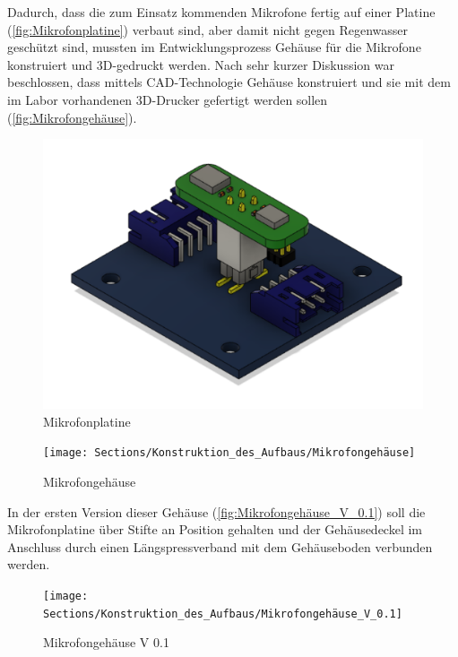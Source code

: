 Dadurch, dass die zum Einsatz kommenden Mikrofone fertig auf einer Platine (\autoref{fig:Mikrofonplatine}) verbaut sind, aber damit nicht gegen Regenwasser geschützt sind, mussten im Entwicklungsprozess Gehäuse für die Mikrofone konstruiert und 3D-gedruckt werden. Nach sehr kurzer Diskussion war beschlossen, dass mittels CAD-Technologie Gehäuse konstruiert und sie mit dem im Labor vorhandenen 3D-Drucker gefertigt werden sollen (\autoref{fig:Mikrofongehäuse}).

\begin{figure}[h]
	\begin{center}
		\includegraphics[scale=0.25]{Sections/Konstruktion_des_Aufbaus/Mikrofonplatine}
	\end{center}
	\caption{Mikrofonplatine}
	\label{fig:Mikrofonplatine}
\end{figure}

\newpage

\begin{figure}[h]
	\begin{center}
		\texttt{[image: Sections/Konstruktion\_des\_Aufbaus/Mikrofongehäuse]}
	\end{center}
	\caption{Mikrofongehäuse}
	\label{fig:Mikrofongehäuse}
\end{figure}

In der ersten Version dieser Gehäuse (\autoref{fig:Mikrofongehäuse_V_0.1}) soll die Mikrofonplatine über Stifte an Position gehalten und der Gehäusedeckel im Anschluss durch einen Längspressverband mit dem Gehäuseboden verbunden werden.

\begin{figure}[h]
	\begin{center}
		\texttt{[image: Sections/Konstruktion\_des\_Aufbaus/Mikrofongehäuse\_V\_0.1]}
	\end{center}
	\caption{Mikrofongehäuse V 0.1}
	\label{fig:Mikrofongehäuse_V_0.1}
\end{figure}


